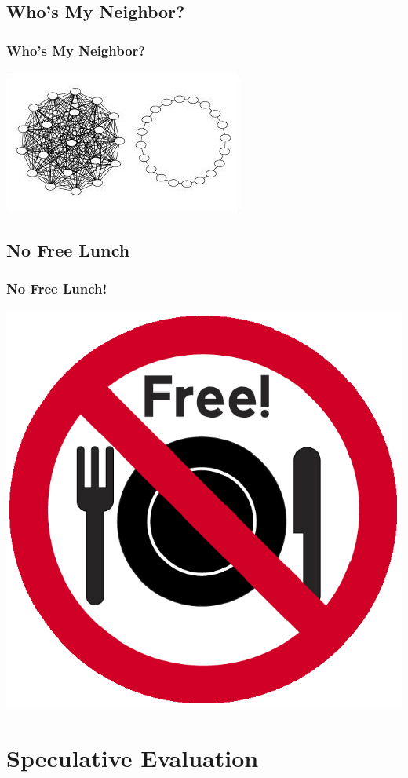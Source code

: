 \documentclass{beamer}
\begin{document}
\subsection{Who's My Neighbor?}
\begin{frame}
  \frametitle{Who's My Neighbor?}
  \includegraphics[width=\textwidth]{gbest_and_lbest.eps}
\end{frame}

\subsection{No Free Lunch}
\begin{frame}
  \frametitle{No Free Lunch!}
  \includegraphics[width=.6\textwidth]{no-free-lunch.eps}
\end{frame}

\section{Speculative Evaluation}
\end{document}
